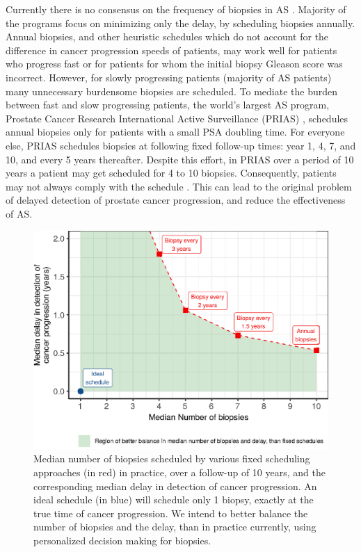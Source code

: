 Currently there is no consensus on the frequency of biopsies in AS \cite{loeb2014heterogeneity}. Majority of the programs focus on minimizing only the delay, by scheduling biopsies annually. Annual biopsies, and other heuristic schedules\cite{inoue2018comparative} which do not account for the difference in cancer progression speeds of patients, may work well for patients who progress fast or for patients for whom the initial biopsy Gleason score was incorrect. However, for slowly progressing patients (majority of AS patients) many unnecessary burdensome biopsies are scheduled. To mediate the burden between fast and slow progressing patients, the world's largest AS program, Prostate Cancer Research International Active Surveillance (PRIAS) \cite{bul2013active}, schedules annual biopsies only for patients with a small PSA doubling time\cite{bokhorst2015compliance}. For everyone else, PRIAS schedules biopsies at following fixed follow-up times: year 1, 4, 7, and 10, and every 5 years thereafter. Despite this effort, in PRIAS over a period of 10 years a patient may get scheduled for 4 to 10 biopsies. Consequently, patients may not always comply with the schedule \cite{bokhorst2015compliance}. This can lead to the original problem of delayed detection of prostate cancer progression, and reduce the effectiveness of AS.
 
\begin{figure}[!htb]
\captionsetup{justification=justified}
\centerline{\includegraphics[width=\columnwidth]{images/better_balance_intro.eps}}
\caption{Median number of biopsies scheduled by various fixed scheduling approaches (in red) in practice, over a follow-up of 10 years, and the corresponding median delay in detection of cancer progression. An ideal schedule (in blue) will schedule only 1 biopsy, exactly at the true time of cancer progression. We intend to better balance the number of biopsies and the delay, than in practice currently, using personalized decision making for biopsies.}
\label{fig:better_balance_intro}
\end{figure}

